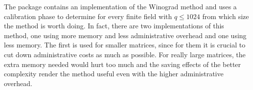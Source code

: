 % 
% 
% 
% 
% 
% 
% 
The {\cvec} package
contains an implementation of the Winograd method and uses a calibration
%
%
phase to determine for every finite field with $q \le 1024$ from which
size the method is worth doing. In fact, there are two implementations
of this method, one using more memory and less administrative overhead
and one using less memory. The first is used for smaller matrices, since
for them it is crucial to cut down administrative costs as much as
possible. For really large matrices, the extra memory needed would hurt
too much and the saving effects of the better complexity render the
method useful even with the higher administrative overhead.

